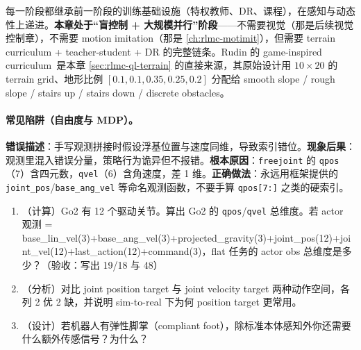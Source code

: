 每一阶段都继承前一阶段的训练基础设施（特权教师、DR、课程），在感知与动态性上递进。\textbf{本章处于“盲控制 + 大规模并行”阶段}——不需要视觉（那是后续视觉控制章），不需要 motion imitation（那是 \cref{ch:rlmc-motimit}），但需要 terrain curriculum + teacher-student + DR 的完整链条。Rudin 的 game-inspired curriculum\,\cite{rudin2021minutes} 是本章 \cref{sec:rlmc-ql-terrain} 的直接来源，其原始设计用 $10\times 20$ 的 terrain grid、地形比例 $[0.1, 0.1, 0.35, 0.25, 0.2]$ 分配给 smooth slope / rough slope / stairs up / stairs down / discrete obstacles。

\paragraph{常见陷阱（自由度与 MDP）。}


\begin{pitfall}
\textbf{错误描述}：手写观测拼接时假设浮基位置与速度同维，导致索引错位。\textbf{现象后果}：观测里混入错误分量，策略行为诡异但不报错。\textbf{根本原因}：\verb|freejoint| 的 \verb|qpos|（7）含四元数，\verb|qvel|（6）含角速度，差 1 维。\textbf{正确做法}：永远用框架提供的 \verb|joint_pos|/\allowbreak\verb|base_ang_vel| 等命名观测函数，不要手算 \verb|qpos[7:]| 之类的硬索引。
\end{pitfall}

\begin{practice}
\begin{enumerate}
\item （计算）Go2 有 12 个驱动关节。算出 Go2 的 \verb|qpos|/\allowbreak\verb|qvel| 总维度。若 actor 观测 = base\_lin\_vel(3)+base\_ang\_vel(3)+projected\_gravity(3)+joint\_pos(12)+joint\_vel(12)+last\_action(12)+command(3)，flat 任务的 actor obs 总维度是多少？（验收：写出 19/18 与 48）
\item （分析）对比 joint position target 与 joint velocity target 两种动作空间，各列 2 优 2 缺，并说明 sim-to-real 下为何 position target 更常用。
\item （设计）若机器人有弹性脚掌（compliant foot），除标准本体感知外你还需要什么额外传感信号？为什么？
\end{enumerate}
\end{practice}

